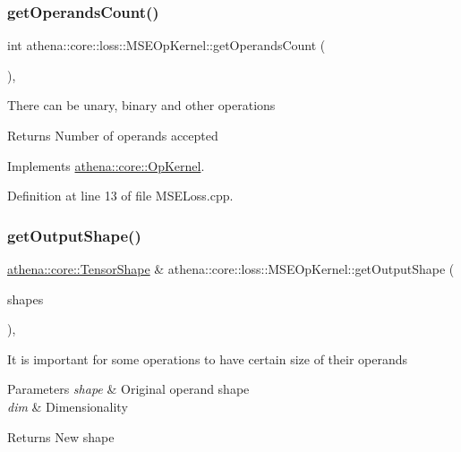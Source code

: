\subsubsection{\texorpdfstring{get\+Operands\+Count()}{getOperandsCount()}}
{\footnotesize\ttfamily int athena\+::core\+::loss\+::\+M\+S\+E\+Op\+Kernel\+::get\+Operands\+Count (\begin{DoxyParamCaption}{ }\end{DoxyParamCaption})\hspace{0.3cm}{\ttfamily [override]}, {\ttfamily [virtual]}}

There can be unary, binary and other operations \begin{DoxyReturn}{Returns}
Number of operands accepted 
\end{DoxyReturn}


Implements \mbox{\hyperlink{classathena_1_1core_1_1_op_kernel_add97d4c132d80ecd9915acfedf7c9119}{athena\+::core\+::\+Op\+Kernel}}.



Definition at line 13 of file M\+S\+E\+Loss.\+cpp.

\mbox{\label{classathena_1_1core_1_1loss_1_1_m_s_e_op_kernel_a23aacffbbc73b177535511702f3c441d}} 
\subsubsection{\texorpdfstring{get\+Output\+Shape()}{getOutputShape()}}
{\footnotesize\ttfamily \mbox{\hyperlink{classathena_1_1core_1_1_tensor_shape}{athena\+::core\+::\+Tensor\+Shape}} \& athena\+::core\+::loss\+::\+M\+S\+E\+Op\+Kernel\+::get\+Output\+Shape (\begin{DoxyParamCaption}\item[{std\+::vector$<$ \mbox{\hyperlink{classathena_1_1core_1_1_tensor_shape}{athena\+::core\+::\+Tensor\+Shape}} $>$ \&}]{shapes }\end{DoxyParamCaption})\hspace{0.3cm}{\ttfamily [override]}, {\ttfamily [virtual]}}

It is important for some operations to have certain size of their operands 
\begin{DoxyParams}{Parameters}
{\em shape} & Original operand shape \\
\hline
{\em dim} & Dimensionality \\
\hline
\end{DoxyParams}
\begin{DoxyReturn}{Returns}
New shape 
\end{DoxyReturn}


